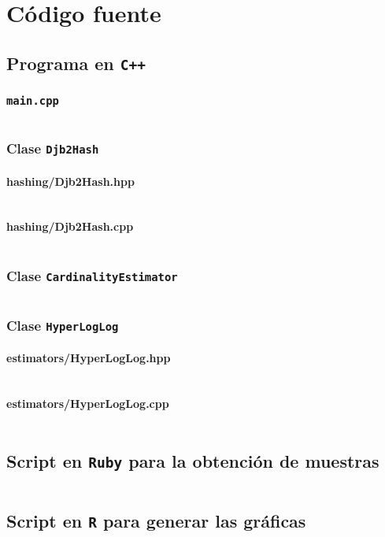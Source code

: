 % 
\section{Código fuente}

\subsection{Programa en \texttt{C++}}
\label{codigo:programa}

\subsubsection{\texttt{main.cpp}}
\inputminted{cpp}{../src/main.cpp}

\subsubsection{Clase \texttt{Djb2Hash}}
\label{codigo:hash}

\paragraph{hashing/Djb2Hash.hpp}
\inputminted{cpp}{../src/hashing/Djb2Hash.hpp}

\paragraph{hashing/Djb2Hash.cpp}
\inputminted{cpp}{../src/hashing/Djb2Hash.cpp}

\subsubsection{Clase \texttt{CardinalityEstimator}}
\inputminted{cpp}{../src/estimators/CardinalityEstimator.hpp}

\subsubsection{Clase \texttt{HyperLogLog}}
\label{codigo:hyperloglog}

\paragraph{estimators/HyperLogLog.hpp}
\inputminted{cpp}{../src/estimators/HyperLogLog.hpp}

\paragraph{estimators/HyperLogLog.cpp}
\inputminted{cpp}{../src/estimators/HyperLogLog.cpp}

\clearpage
\subsection{Script en \texttt{Ruby} para la obtención de muestras}
\label{codigo:ruby}
\inputminted{rb}{../test.rb}

\subsection{Script en \texttt{R} para generar las gráficas}
\label{codigo:graficas}
\inputminted{r}{../plots.r}